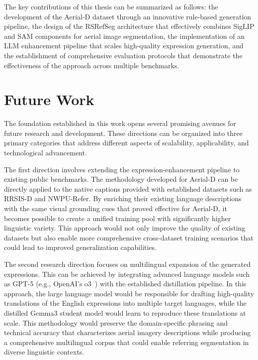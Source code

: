 The key contributions of this thesis can be summarized as follows: the development of the Aerial-D dataset through an innovative rule-based generation pipeline, the design of the RSRefSeg architecture that effectively combines SigLIP and SAM components for aerial image segmentation, the implementation of an LLM enhancement pipeline that scales high-quality expression generation, and the establishment of comprehensive evaluation protocols that demonstrate the effectiveness of the approach across multiple benchmarks.

\section{Future Work}

The foundation established in this work opens several promising avenues for future research and development. These directions can be organized into three primary categories that address different aspects of scalability, applicability, and technological advancement.

The first direction involves extending the expression-enhancement pipeline to existing public benchmarks. The methodology developed for Aerial-D can be directly applied to the native captions provided with established datasets such as RRSIS-D and NWPU-Refer. By enriching their existing language descriptions with the same visual grounding cues that proved effective for Aerial-D, it becomes possible to create a unified training pool with significantly higher linguistic variety. This approach would not only improve the quality of existing datasets but also enable more comprehensive cross-dataset training scenarios that could lead to improved generalization capabilities.

The second research direction focuses on multilingual expansion of the generated expressions. This can be achieved by integrating advanced language models such as GPT-5 (e.g., OpenAI's o3~\cite{o3}) with the established distillation pipeline. In this approach, the large language model would be responsible for drafting high-quality translations of the English expressions into multiple target languages, while the distilled Gemma3 student model would learn to reproduce these translations at scale. This methodology would preserve the domain-specific phrasing and technical accuracy that characterizes aerial imagery descriptions while producing a comprehensive multilingual corpus that could enable referring segmentation in diverse linguistic contexts.

